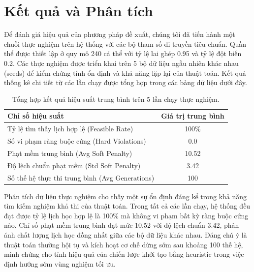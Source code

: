 \section{Kết quả và Phân tích}

Để đánh giá hiệu quả của phương pháp đề xuất, chúng tôi đã tiến hành một chuỗi thực nghiệm trên hệ thống với các bộ tham số di truyền tiêu chuẩn. Quần thể được thiết lập ở quy mô 240 cá thể với tỷ lệ lai ghép 0.95 và tỷ lệ đột biến 0.2. Các thực nghiệm được triển khai trên 5 bộ dữ liệu ngẫu nhiên khác nhau (seeds) để kiểm chứng tính ổn định và khả năng lặp lại của thuật toán. Kết quả thống kê chi tiết từ các lần chạy được tổng hợp trong các bảng dữ liệu dưới đây.

\begin{table}[H]
    \centering
    \begin{tabular}{|l|c|}
    \hline
    \textbf{Chỉ số hiệu suất} & \textbf{Giá trị trung bình} \\ \hline
    Tỷ lệ tìm thấy lịch hợp lệ (Feasible Rate) & 100\% \\ \hline
    Số vi phạm ràng buộc cứng (Hard Violations) & 0.0 \\ \hline
    Phạt mềm trung bình (Avg Soft Penalty) & 10.52 \\ \hline
    Độ lệch chuẩn phạt mềm (Std Soft Penalty) & 3.42 \\ \hline
    Số thế hệ thực thi trung bình (Avg Generations) & 100 \\ \hline
    \end{tabular}
    \caption{Tổng hợp kết quả hiệu suất trung bình trên 5 lần chạy thực nghiệm.}
    \label{tab:summary_results}
\end{table}

Phân tích dữ liệu thực nghiệm cho thấy một sự ổn định đáng kể trong khả năng tìm kiếm nghiệm khả thi của thuật toán. Trong tất cả các lần chạy, hệ thống đều đạt được tỷ lệ lịch học hợp lệ là 100\% mà không vi phạm bất kỳ ràng buộc cứng nào. Chỉ số phạt mềm trung bình đạt mức 10.52 với độ lệch chuẩn 3.42, phản ánh chất lượng lịch học đồng nhất giữa các bộ dữ liệu khác nhau. Đáng chú ý là thuật toán thường hội tụ và kích hoạt cơ chế dừng sớm sau khoảng 100 thế hệ, minh chứng cho tính hiệu quả của chiến lược khởi tạo bằng heuristic trong việc định hướng sớm vùng nghiệm tối ưu.

